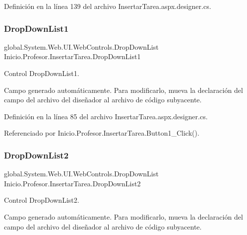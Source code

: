 Definición en la línea 139 del archivo Insertar\+Tarea.\+aspx.\+designer.\+cs.

\mbox{\label{classInicio_1_1Profesor_1_1InsertarTarea_a48d596bdb2209597a6836d27775493e9}} 
\subsubsection{\texorpdfstring{DropDownList1}{DropDownList1}}
{\footnotesize\ttfamily global.\+System.\+Web.\+U\+I.\+Web\+Controls.\+Drop\+Down\+List Inicio.\+Profesor.\+Insertar\+Tarea.\+Drop\+Down\+List1\hspace{0.3cm}{\ttfamily [protected]}}



Control Drop\+Down\+List1. 

Campo generado automáticamente. Para modificarlo, mueva la declaración del campo del archivo del diseñador al archivo de código subyacente. 

Definición en la línea 85 del archivo Insertar\+Tarea.\+aspx.\+designer.\+cs.



Referenciado por Inicio.\+Profesor.\+Insertar\+Tarea.\+Button1\+\_\+\+Click().

\mbox{\label{classInicio_1_1Profesor_1_1InsertarTarea_a3a157cb6f654a20976e2c247e3e6a26a}} 
\subsubsection{\texorpdfstring{DropDownList2}{DropDownList2}}
{\footnotesize\ttfamily global.\+System.\+Web.\+U\+I.\+Web\+Controls.\+Drop\+Down\+List Inicio.\+Profesor.\+Insertar\+Tarea.\+Drop\+Down\+List2\hspace{0.3cm}{\ttfamily [protected]}}



Control Drop\+Down\+List2. 

Campo generado automáticamente. Para modificarlo, mueva la declaración del campo del archivo del diseñador al archivo de código subyacente. 


